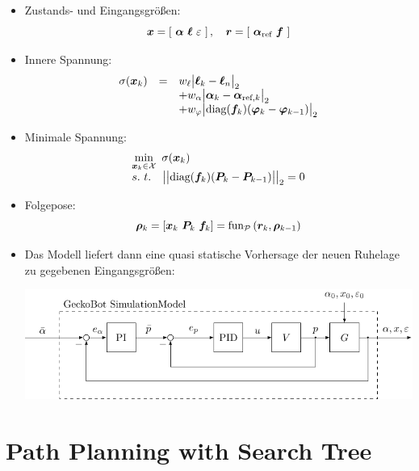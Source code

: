 \documentclass[10pt,a4paper]{article}
\begin{document}
	\begin{itemize}
		\item Zustands- und Eingangsgrößen:
		$$
		\bm{x} = \left[~\bm{\alpha}~\bm{\ell}~\varepsilon~\right],~~~
		\bm{r} = \left[~\bm{\alpha}_{\textnormal{ref}}~\bm{f}~\right]
		$$
		
		\item Innere Spannung:
		$$
		\begin{array}{rcl}
		\sigma(\bm{x}_{k}) 
		&=&  w_\ell\big| \bm{\ell}_{k} - \bm{\ell}_n \big|_2 \\
		&&	+ w_\alpha\big| \bm{\alpha}_{k} - \bm{\alpha}_{\textnormal{ref},k} \big|_2 \\
		&&	+ w_\varphi \big| \textnormal{diag}(\bm{f}_k) ( \bm{\varphi}_{k} - \bm{\varphi}_{k-1}) \big|_2 \\
		\end{array}
		$$
		
		\item Minimale Spannung:
		$$
		\begin{array}{l}
		\displaystyle\min_{\bm{x}_k \in \mathcal{X}} ~ \sigma(\bm{x}_k) \\
		s.~t.~~~
		\big|\big|\textnormal{diag}(\bm{f}_k)(\bm{P}_{k} - \bm{P}_{k-1})\big|\big|_2 = 0
		\end{array}
		$$
		
		\item Folgepose:
		$$
		\bm{\rho}_k = [\bm{x}_k~\bm{P}_k~\bm{f}_k] = \textnormal{fun}_{\mathcal{P}}\left( \bm{r}_k, \bm{\rho}_{k-1} \right)
		$$
		
		\item Das Modell liefert dann eine quasi statische Vorhersage der neuen Ruhelage zu gegebenen Eingangsgrößen:
		
		\includegraphics[scale=1]{pics/CtrLoops/GeckoBotModel.pdf}
	\end{itemize}
	


\section{Path Planning with Search Tree}
\end{document}
